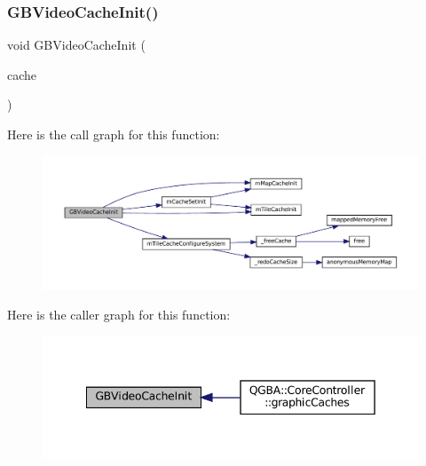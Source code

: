 \subsubsection{\texorpdfstring{G\+B\+Video\+Cache\+Init()}{GBVideoCacheInit()}}
{\footnotesize\ttfamily void G\+B\+Video\+Cache\+Init (\begin{DoxyParamCaption}\item[{struct m\+Cache\+Set $\ast$}]{cache }\end{DoxyParamCaption})}

Here is the call graph for this function\+:
\nopagebreak
\begin{figure}[H]
\begin{center}
\leavevmode
\includegraphics[width=350pt]{gb_2renderers_2cache-set_8c_ae7e228e583d5f680af631188c85bdf5e_cgraph}
\end{center}
\end{figure}
Here is the caller graph for this function\+:
\nopagebreak
\begin{figure}[H]
\begin{center}
\leavevmode
\includegraphics[width=342pt]{gb_2renderers_2cache-set_8c_ae7e228e583d5f680af631188c85bdf5e_icgraph}
\end{center}
\end{figure}
\mbox{\label{gb_2renderers_2cache-set_8c_a30ce6f53accfe469551fc0454c23d53c}} 
